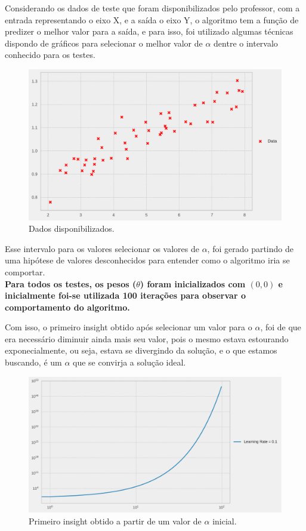 \documentclass[a4paper, 12pt]{article}
\begin{document}
Considerando os dados de teste que foram disponibilizados pelo professor, com a entrada representando o eixo X, 
e a saída o eixo Y, o algoritmo tem a função de predizer o melhor valor para a saída, e para isso, foi utilizado
algumas técnicas dispondo de gráficos para selecionar o melhor valor de $\alpha$ dentre o intervalo conhecido para 
os testes.

\begin{figure}[!h]
    \centering
    \includegraphics[width=1\textwidth]{../imgs/data.pdf}
    \caption{Dados disponibilizados.}
    \label{fig:data}
\end{figure}
\clearpage

Esse intervalo para os valores selecionar os valores de $\alpha$, foi gerado partindo de uma hipótese de valores 
desconhecidos para entender como o algoritmo iria se comportar.\\

\textbf{Para todos os testes, os pesos ($\theta$) foram inicializados com $(0,0)$ e inicialmente foi-se 
utilizada 100 iterações para observar o comportamento do algoritmo.\\}

Com isso, o primeiro insight obtido após selecionar um valor para o $\alpha$, foi de que era necessário diminuir
ainda mais seu valor, pois o mesmo estava estourando exponecialmente, ou seja, estava se divergindo da solução,
e o que estamos buscando, é um $\alpha$ que se convirja a solução ideal.

\begin{figure}[!h]
    \centering
    \includegraphics[width=1\textwidth]{../imgs/first_insight.pdf}
    \caption{Primeiro insight obtido a partir de um valor de $\alpha$ inicial.}
    \label{fig:first_insight}
\end{figure}
\clearpage
\end{document}
